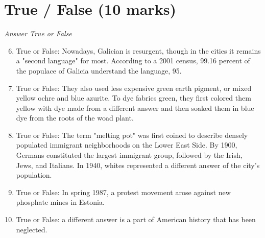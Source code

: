 \documentclass[12pt]{article}
\begin{document}
\section*{True / False (10 marks)}
\textit{Answer True or False}
\begin{enumerate}[label=\arabic*.]
\setcounter{enumi}{5}
\item True or False: Nowadays, Galician is resurgent, though in the cities it remains a "second language" for most. According to a 2001 census, 99.16 percent of the populace of Galicia understand the language, 95.
\item True or False: They also used less expensive green earth pigment, or mixed yellow ochre and blue azurite. To dye fabrics green, they first colored them yellow with dye made from a different answer and then soaked them in blue dye from the roots of the woad plant.
\item True or False: The term "melting pot" was first coined to describe densely populated immigrant neighborhoods on the Lower East Side. By 1900, Germans constituted the largest immigrant group, followed by the Irish, Jews, and Italians. In 1940, whites represented a different answer of the city's population.
\item True or False: In spring 1987, a protest movement arose against new phosphate mines in Estonia.
\item True or False: a different answer is a part of American history that has been neglected.
\end{enumerate}
\end{document}
